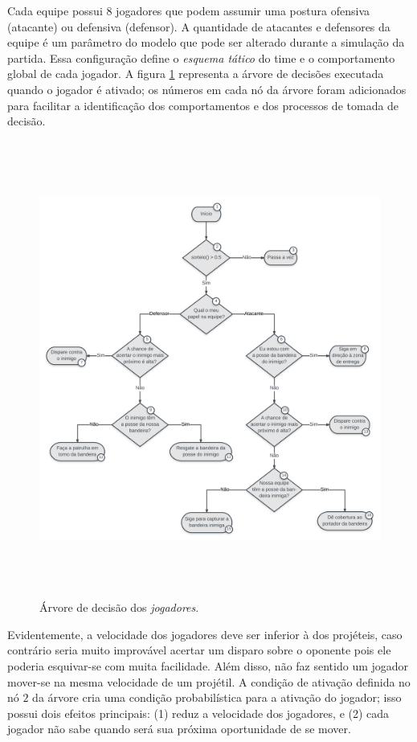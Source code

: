 \documentclass[preprint,12pt]{elsarticle}
\begin{document}
Cada equipe possui 8 jogadores que podem assumir uma postura ofensiva (atacante) ou defensiva (defensor). A quantidade de atacantes e defensores da equipe é um parâmetro do modelo que pode ser alterado durante a simulação da partida. Essa configuração define o \textit{esquema tático} do time e o comportamento global de cada jogador. A figura \ref{fig:flag-decision-tree} representa a árvore de decisões executada quando o jogador é ativado; os números em cada nó da árvore foram adicionados para facilitar a identificação dos comportamentos e dos processos de tomada de decisão.

\begin{figure}
	\centering
	\includegraphics[height=15cm]{figures/flag-tree.png}
	\caption{Árvore de decisão dos \textit{jogadores}.}
	\label{fig:flag-decision-tree}
\end{figure}

Evidentemente, a velocidade dos jogadores deve ser inferior à dos projéteis, caso contrário seria muito improvável acertar um disparo sobre o oponente pois ele poderia esquivar-se com muita facilidade. Além disso, não faz sentido um jogador mover-se na mesma velocidade de um projétil. A condição de ativação definida no nó $2$ da árvore cria uma condição probabilística para a ativação do jogador; isso possui dois efeitos principais: (1) reduz a velocidade dos jogadores, e (2) cada jogador não sabe quando será sua próxima oportunidade de se mover.
\end{document}
